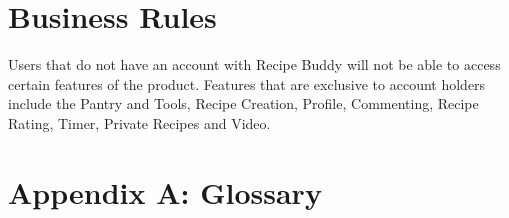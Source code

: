\documentclass{scrreprt}
\begin{document}
\section{Business Rules}
Users that do not have an account with \gls{Recipe Buddy} will not be able to access certain features of the product. Features that are exclusive to account holders include the Pantry and Tools, Recipe Creation, Profile, Commenting, Recipe Rating, Timer, Private Recipes and Video.

\section{Appendix A: Glossary}
\printglossaries


\end{document}
